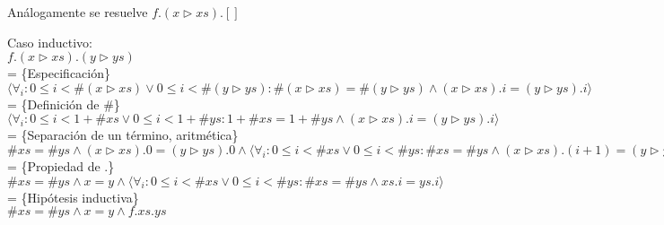\documentclass[12pt]{article}
\begin{document}
\begin{itemize}
    \bigbreak

    Análogamente se resuelve $ f.(x \triangleright xs).[] $

    \bigbreak

    Caso inductivo:\\
    $ f.(x \triangleright xs).(y \triangleright ys) $\\
    = \{Especificación\}\\
    $ \langle \forall_i : 0 \le i < \#(x \triangleright xs) \lor 0 \le i < \#(y \triangleright ys) : \#(x \triangleright xs) = \#(y \triangleright ys) \land (x \triangleright xs).i = (y \triangleright ys).i \rangle $\\
    = \{Definición de \#\}\\
    $ \langle \forall_i : 0 \le i < 1 + \#xs \lor 0 \le i < 1 + \#ys : 1 + \#xs = 1 + \#ys \land (x \triangleright xs).i = (y \triangleright ys).i \rangle $\\
    = \{Separación de un término, aritmética\}\\
    $ \#xs = \#ys \land (x \triangleright xs).0 = (y \triangleright ys).0 \land \langle \forall_i : 0 \le i < \#xs \lor 0 \le i < \#ys : \#xs = \#ys \land (x \triangleright xs).(i + 1) = (y \triangleright ys).(i + 1) \rangle $\\
    = \{Propiedad de .\}\\
    $ \#xs = \#ys \land x = y \land \langle \forall_i : 0 \le i < \#xs \lor 0 \le i < \#ys : \#xs = \#ys \land xs.i = ys.i \rangle $\\
    = \{Hipótesis inductiva\}\\
    $ \#xs = \#ys \land x = y \land f.xs.ys $\\

\end{itemize}
\end{document}
